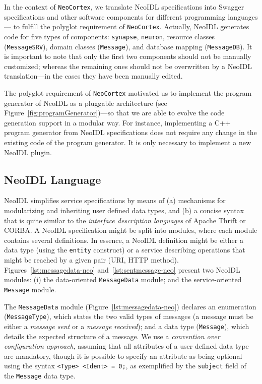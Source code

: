 \documentclass{ws-ijseke}
\newcommand{\neoidl}{NeoIDL}
\newcommand{\neocortex}{\texttt{NeoCortex}}
\begin{document}
In the context of \neocortex{}, we translate \neoidl{} specifications into
Swagger specifications and other software components for 
different programming languages--- to fulfill the polyglot requirement
of \neocortex. 
Actually, \neoidl{} generates code for five types of components: 
\texttt{synapse}, \texttt{neuron}, resource classes
(\texttt{MessageSRV}), domain classes (\texttt{Message}), 
and database mapping (\texttt{MessageDB}).
It is important to note that only 
the first two components should not be manually customized; whereas
the remaining ones should not be overwritten by a \neoidl{}
translation---in the cases they have been manually edited. 


The polyglot requirement of \neocortex{} motivated us to implement 
the program generator of \neoidl{} as a pluggable architecture 
(see Figure~\ref{fig:programGenerator})---so that
we are able to evolve the code generation support in a modular
way. For instance, implementing a C++ program generator from \neoidl{}
specifications does not require any change in the existing code of the
program generator. It is only necessary to implement a new \neoidl{}
plugin. 









\subsection{NeoIDL Language}\label{sub:langConstructs}

\neoidl{} simplifies service specifications by means of 
(a) mechanisms for modularizing and inheriting user defined data 
types, and (b) a concise syntax that is quite similar to the 
\emph{interface description languages} of Apache Thrift or CORBA. A 
\neoidl{} specification might be split into modules, where each
module contains several definitions. In essence, a \neoidl{} definition might be either a 
data type (using the \texttt{entity} construct) or a service describing
operations that might be reached by a given pair (URI, HTTP
method). Figures~\ref{lst:messagedata-neo}
and~\ref{lst:sentmessage-neo} present two \neoidl{} modules:
(i) the data-oriented \texttt{MessageData} module;
and the service-oriented \texttt{Message} module.

The \texttt{MessageData} module (Figure~\ref{lst:messagedata-neo})
declares an enumeration
(\texttt{MessageType}), which states the two valid types of
messages (a message must be either a \emph{message sent} or
a \emph{message received}); and a data type (\texttt{Message}),
which details the expected structure of a
message. We use a \emph{convention over configuration approach}, 
assuming that all attributes of a user defined data type are
mandatory, though it is possible to specify an attribute as being optional  
using the syntax \texttt{<Type> <Ident> = 0;}, as exemplified by
the \texttt{subject} field of the \texttt{Message} data type.
\end{document}
